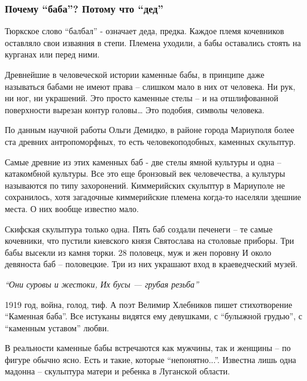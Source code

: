  
 
 
 
 

\subsubsection{Почему \enquote{баба}? Потому что \enquote{дед}}

Тюркское слово \enquote{балбал} - означает деда, предка. Каждое племя кочевников
оставляло свои изваяния в степи. Племена уходили, а бабы оставались стоять на
курганах или перед ними.

Древнейшие в человеческой истории каменные бабы, в принципе даже называться
бабами не имеют права – слишком мало в них от человека. Ни рук, ни ног, ни
украшений. Это просто каменные стелы – и на отшлифованной поверхности вырезан
контур головы… Это подобия, символы человека.

По данным научной работы Ольги Демидко, в районе города Мариуполя более ста
древних антропоморфных, то есть человекоподобных, каменных скульптур.

Самые древние из этих каменных баб - две стелы ямной культуры и одна –
катакомбной культуры. Все это еще бронзовый век человечества, а культуры
называются по типу захоронений. Киммерийских скульптур в Мариуполе не
сохранилось, хотя загадочные киммерийские племена когда-то населяли здешние
места. О них вообще известно мало.

Скифская скульптура только одна. Пять баб создали печенеги – те самые
кочевники, что пустили киевского князя Святослава на столовые приборы. Три бабы
высекли из камня торки. 28 половецк, муж и жен поровну И около девяноста баб –
половецкие. Три из них украшают вход в краеведческий музей.

\emph{\enquote{Они суровы и жестоки, Их бусы — грубая резьба}}

1919 год, война, голод, тиф. А поэт Велимир Хлебников пишет стихотворение
\enquote{Каменная баба}. Все истуканы видятся ему девушками, с \enquote{булыжной грудью}, с
\enquote{каменным уставом} любви.

В реальности каменные бабы встречаются как мужчины, так и женщины – по фигуре
обычно ясно. Есть и такие, которые \enquote{непонятно...}. Известна лишь одна мадонна –
скульптура матери и ребенка в Луганской области.

